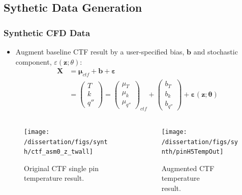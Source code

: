 \documentclass[t, pdftex]{beamer}
\begin{document}
\subsection*{Sythetic Data Generation}
\begin{frame}
\frametitle{Synthetic CFD Data}
\vspace{-18pt}
\begin{itemize}
    \item Augment baseline CTF result by a user-specified bias, $\mathbf b$ and stochastic component, $\varepsilon(\mathbf z; \theta)$:
    \begin{align}
    \mathbf X &= \mathbf \mu_{ctf} + \mathbf b + \mathbf \varepsilon \nonumber \\
    &=
    \begin{pmatrix}
    T \\
    k \\
    q''
    \end{pmatrix}
    =
    \begin{pmatrix}
    \mu_{T} \\
    \mu_k \\
    \mu_{q''}
    \end{pmatrix}_{ctf}
    + \begin{pmatrix}
    b_{T} \\
    b_k \\
    b_{q''}
    \end{pmatrix}
    + \mathbf{\varepsilon} (\mathbf z; \mathbf \theta) \nonumber
    \end{align}
\end{itemize}
\vspace{-20pt}
\begin{columns}
    \begin{column}{0.5\textwidth}
        \begin{figure}[H]%
            \centering
            \texttt{[image: /dissertation/figs/synth/ctf\_asm0\_z\_twall]}       
            \caption{\centering Original CTF single pin \\ temperature result.}%
        \end{figure}
    \end{column}
    \begin{column}{0.5\textwidth}
         \begin{figure}[H]%
            \centering
             \texttt{[image: /dissertation/figs/synth/pinH5TempOut]}
            
            \caption{\centering Augmented CTF temperature \\ result.}%
            \label{fig:ctf_twall_aug}%
        \end{figure}
    \end{column}
\end{columns}
\end{frame}
\end{document}
